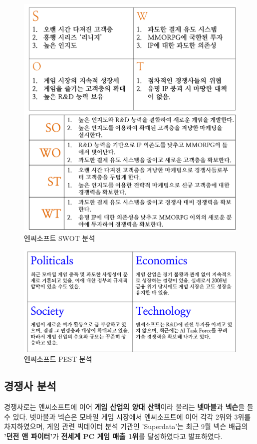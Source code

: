 \documentclass[11pt]{oblivoir}
\begin{document}
		\begin{figure}[htbp]
			\centering
			\includegraphics[width=1\textwidth]{Pictures/SWOT.png}
			\caption{엔씨소프트 SWOT 분석}
		\end{figure}
	
		\begin{figure}[htbp]
			\centering
			\includegraphics[width=1\textwidth]{Pictures/PEST.png}
			\caption{엔씨소프트 PEST 분석}
		\end{figure}
		
		\pagebreak
		
		\subsection{경쟁사 분석}
		경쟁사로는 엔씨소프트에 이어 \textbf{게임 산업의 양대 산맥}이라 불리는 \textbf{넷마블}과 \textbf{넥슨}을 들 수 있다. 넷마블과 넥슨은 모바일 게임 시장에서 엔씨소프트에 이어 각각 2위와 3위를 차지하였으며, 게임 관련 빅데이터 분석 기관인 'Superdata'는 최근 9월 넥슨 배급의 \textbf{'던전 앤 파이터'}가 \textbf{전세계 PC 게임 매출 1위}를 달성하였다고 발표하였다.
		
\end{document}
